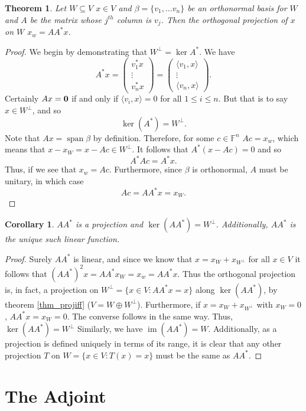 \documentclass[oneside, 12pt]{book}
\DeclareMathOperator{\spn}{span}
\DeclareMathOperator{\im}{im}
\newtheorem{thm}{Theorem}[section]
\newtheorem{cor}{Corollary}[section]
\theoremstyle{definition}
\begin{document}
\begin{thm}
Let $W \subseteq V$ $x \in V$ and $\beta=\{v_{1}, \dots v_{n}\}$ be an orthonormal basis for $W$ and $A$ be the matrix whose $j^{th}$ column is $v_{j}$. Then the orthogonal projection of $x$ on $W$ $x_{w}=AA^{*}x$.
\end{thm}

\begin{proof}
  We begin by demonstrating that $W^{\perp}=\ker A^{*}$. We have
  \[A^{*}x= \begin{pmatrix}v_{1}^{*}x \\ \vdots \\ v_{n}^{*}x \end{pmatrix}=\begin{pmatrix}\langle v_{1}, x \rangle \\  \vdots \\ \langle v_{n}, x \rangle\end{pmatrix}.\] Certainly
  $Ax=\bold{0}$ if and only if $\langle v_{i}, x \rangle=0$ for all $1 \leq i \leq n$. But that is to say $x \in W^{\perp}$, and so \[\ker(A^{*})=W^{\perp}.\]
  Note that $Ax=\spn\beta$ by definition. Therefore, for some $c \in \mathbb{F}^{n}$ $Ac=x_{w}$, which means that $x-x_{W}=x-Ac \in W^{\perp}$. It follows that
  $A^{*}(x-Ac)=0$ and so \[A^{*}Ac=A^{*}x.\] Thus, if we see that $x_{w}=Ac$. Furthermore, since $\beta$ is orthonormal, $A$ must be unitary, in which case \[Ac=AA^{*}x=x_{W}.\]
\end{proof}
\begin{cor}
  \label{cor_orthproj}
$AA^{*}$ is a projection and $\ker(AA^{*})=W^{\perp}$. Additionally, $AA^{*}$ is the unique such linear function.
\end{cor}
\begin{proof}
  Surely $AA^{*}$ is linear, and since we know that $x=x_{W}+x_{W^{\perp}}$ for all $x \in V$ it follows that $(AA^{*})^{2}x=AA^{*}x_{W}=x_{w}=AA^{*}x$. Thus the orthogonal projection is, in fact, a projection on $W^{\perp}=\{x \in V: AA^{*}x=x \}$ along $\ker(AA^{*})$, by theorem \ref{thm_projiff} ($V=W \oplus W^{\perp}$). Furthermore, if $x=x_{W}+x_{W^{\perp}}$ with $x_{W}=0$, $AA^{*}x=x_{W}=0$. The converse follows in the same way. Thus, $\ker(AA^{*})=W^{\perp}$ Similarly, we have $\im(AA^{*})=W$. Additionally, as a projection is defined uniquely in terms of its range, it is clear that any other projection $T$ on $W=\{x \in V: T(x)=x\}$ must be the same as $AA^{*}$.
\end{proof}
\section{The Adjoint}
\end{document}
